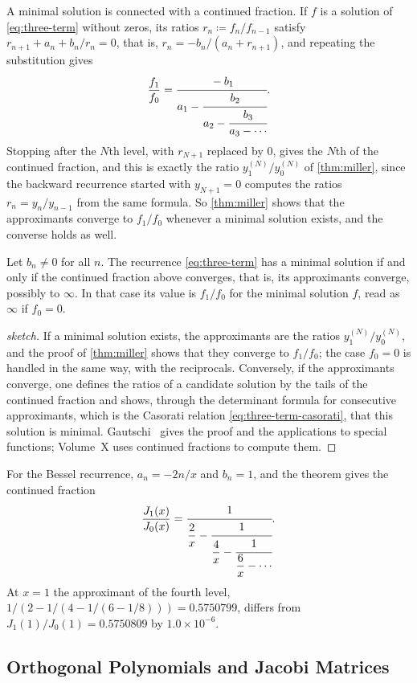 A minimal solution is connected with a continued fraction. If $f$ is a solution of \eqref{eq:three-term} without zeros, its ratios $r_n\coloneqq f_n/f_{n-1}$ satisfy $r_{n+1}+a_n+b_n/r_n=0$, that is, $r_n=-b_n/(a_n+r_{n+1})$, and repeating the substitution gives
\[
\frac{f_1}{f_0}=\cfrac{-b_1}{a_1-\cfrac{b_2}{a_2-\cfrac{b_3}{a_3-\cdots}}} .
\]
Stopping after the $N$th level, with $r_{N+1}$ replaced by $0$, gives the $N$th  of the continued fraction, and this is exactly the ratio $y^{(N)}_1/y^{(N)}_0$ of \cref{thm:miller}, since the backward recurrence started with $y_{N+1}=0$ computes the ratios $r_n=y_n/y_{n-1}$ from the same formula. So \cref{thm:miller} shows that the approximants converge to $f_1/f_0$ whenever a minimal solution exists, and the converse holds as well.

\begin{theorem}[Pincherle]
\label{thm:pincherle}
Let $b_n\ne0$ for all $n$. The recurrence \eqref{eq:three-term} has a minimal solution if and only if the continued fraction above converges, that is, its approximants converge, possibly to $\infty$. In that case its value is $f_1/f_0$ for the minimal solution $f$, read as $\infty$ if $f_0=0$.
\end{theorem}

\begin{proof}[sketch]
If a minimal solution exists, the approximants are the ratios $y^{(N)}_1/y^{(N)}_0$, and the proof of \cref{thm:miller} shows that they converge to $f_1/f_0$; the case $f_0=0$ is handled in the same way, with the reciprocals. Conversely, if the approximants converge, one defines the ratios of a candidate solution by the tails of the continued fraction and shows, through the determinant formula for consecutive approximants, which is the Casorati relation \eqref{eq:three-term-casorati}, that this solution is minimal. Gautschi~\cite{gautschi1967} gives the proof and the applications to special functions; Volume~X uses continued fractions to compute them.
\end{proof}

For the Bessel recurrence, $a_n=-2n/x$ and $b_n=1$, and the theorem gives the continued fraction
\[
\frac{J_1(x)}{J_0(x)}=\cfrac1{\dfrac2x-\cfrac1{\dfrac4x-\cfrac1{\dfrac6x-\cdots}}} .
\]
At $x=1$ the approximant of the fourth level, $1/(2-1/(4-1/(6-1/8)))=0.5750799$, differs from $J_1(1)/J_0(1)=0.5750809$ by $1.0\times10^{-6}$.

\subsection{Orthogonal Polynomials and Jacobi Matrices}

